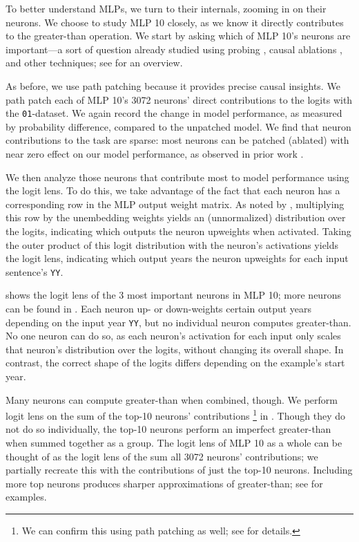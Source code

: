 \documentclass{article}
\newcommand{\YY}{\texttt{YY}}
\begin{document}
    To better understand MLPs, we turn to their internals, zooming in on their neurons. We choose to study MLP 10 closely, as we know it directly contributes to the greater-than operation. We start by asking which of MLP 10's neurons are important---a sort of question already studied using probing \citep{Dalvi_Durrani_Sajjad_Belinkov_Bau_Glass_2019,durrani-etal-2020-analyzing}, causal ablations \citep{bau2018identifying,lakretz-etal-2019-emergence,vig2020causal}, and other techniques; see \citet{sajjad-etal-2022-neuron} for an overview.
    
    As before, we use path patching because it provides precise causal insights. We path patch each of MLP 10's 3072 neurons' direct contributions to the logits with the \texttt{01}-dataset. We again record the change in model performance, as measured by probability difference, compared to the unpatched model. We find that neuron contributions to the task are sparse: most neurons can be patched (ablated) with near zero effect on our model performance, as observed in prior work \citep{vig2020causal}. 

    We then analyze those neurons that contribute most to model performance using the logit lens. To do this, we take advantage of the fact that each neuron has a corresponding row in the MLP output weight matrix. As noted by \citet{geva-etal-2021-transformer}, multiplying this row by the unembedding weights yields an (unnormalized) distribution over the logits, indicating which outputs the neuron upweights when activated. Taking the outer product of this logit distribution with the neuron's activations yields the logit lens, indicating which output years the neuron upweights for each input sentence's \YY.

     shows the logit lens of the 3 most important neurons in MLP 10; more neurons can be found in . Each neuron up- or down-weights certain output years depending on the input year \YY, but no individual neuron computes greater-than. No one neuron can do so, as each neuron's activation for each input only scales that neuron's distribution over the logits, without changing its overall shape. In contrast, the correct shape of the logits differs depending on the example's start year. 

    Many neurons can compute greater-than when combined, though. We perform logit lens on the sum of the top-10 neurons' contributions \footnote{We can confirm this using path patching as well; see  for details.} in . Though they do not do so individually, the top-10 neurons perform an imperfect greater-than when summed together as a group. The logit lens of MLP 10 as a whole can be thought of as the logit lens of the sum all 3072 neurons' contributions; we partially recreate this with the contributions of just the top-10 neurons. Including more top neurons produces sharper approximations of greater-than; see  for examples.
\end{document}
